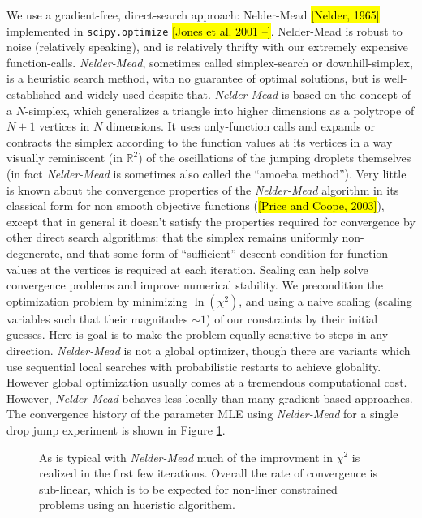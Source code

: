 \documentclass[10pt,a4paper]{article}
\begin{document}
We use a gradient-free, direct-search approach: Nelder-Mead \hl{[Nelder, 1965]} implemented in \verb|scipy.optimize| \hl{[Jones et al. 2001 --]}. Nelder-Mead is robust to noise (relatively speaking), and is relatively thrifty with our extremely expensive function-calls.  \emph{Nelder-Mead}, sometimes called simplex-search or downhill-simplex, is a heuristic search method, with no guarantee of optimal solutions, but is well-established and widely used despite that. \emph{Nelder-Mead} is based on the concept of a $N$-simplex, which generalizes a triangle into higher dimensions as a polytrope of $N + 1$ vertices in $N$ dimensions. It uses only-function calls and expands or contracts the simplex according to the function values at its vertices in a way visually reminiscent (in $\mathbb{R}^2$) of the oscillations of the jumping droplets themselves (in fact \emph{Nelder-Mead} is sometimes also called the ``amoeba method''). Very little is known about the convergence properties of the \emph{Nelder-Mead} algorithm in its classical form for non smooth objective functions (\hl{[Price and Coope, 2003]}), except that in general it doesn't satisfy the properties required for convergence by other direct search algorithms: that the simplex remains uniformly non-degenerate, and that some form of ``sufficient'' descent condition for function values at the vertices is required at each iteration. Scaling can help solve convergence problems and improve numerical stability. We precondition the optimization problem by minimizing $\ln(\chi^2)$, and using a naive scaling (scaling variables such that their magnitudes $\sim 1$) of our constraints by their initial guesses. Here is goal is to make the problem equally sensitive to steps in any direction. \emph{Nelder-Mead} is not a global optimizer, though there are variants which use sequential local searches with probabilistic restarts to achieve globality. However global optimization usually comes at a tremendous computational cost. However, \emph{Nelder-Mead} behaves less locally than many gradient-based approaches. The convergence history of the parameter MLE using \emph{Nelder-Mead} for a single drop jump experiment is shown in Figure \ref{fig:convergence}.

\begin{figure}[h]
    \centering
    
    \caption{As is typical with \emph{Nelder-Mead} much of the improvment in $\chi^2$ is realized in the first few iterations. Overall the rate of convergence is sub-linear, which is to be expected for non-liner constrained problems using an hueristic algorithem.\label{fig:convergence}}
\end{figure}
\end{document}
